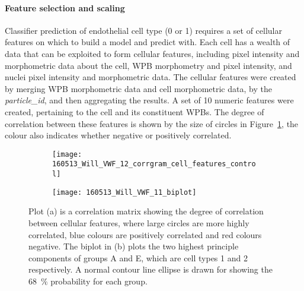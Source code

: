 \paragraph{Feature selection and scaling}
Classifier prediction of endothelial cell type (0 or 1) requires a set of cellular features on which to build a model and predict with. Each cell has a wealth of data that can be exploited to form cellular features, including pixel intensity and morphometric data about the cell, WPB morphometry and pixel intensity, and nuclei pixel intensity and morphometric data. The cellular features were created by merging WPB morphometric data and cell morphometric data, by the \emph{particle\_id}, and then aggregating the results. A set of 10 numeric features were created, pertaining to the cell and its constituent WPBs. The degree of correlation between these features is shown by the size of circles in Figure~\ref{figure:cell_classification:corrgram}, the colour also indicates whether negative or positively correlated.

\begin{figure}[!htbp]
	\centering
	\begin{subfigure}[b]{0.73\linewidth}
		\texttt{[image: 160513\_Will\_VWF\_12\_corrgram\_cell\_features\_control]}
		\caption{}
		\label{figure:cell_classification:corrgram}
	\end{subfigure}
	\begin{subfigure}[b]{0.73\linewidth}
		\texttt{[image: 160513\_Will\_VWF\_11\_biplot]}
		\caption{}
		\label{figure:cell_classification:ggbiplot}
	\end{subfigure}
	\caption[Correlation matrix cellular features plot and biplot of PCA]{Plot (a) is a correlation matrix showing the degree of correlation between cellular features, where large circles are more highly correlated, blue colours are positively correlated and red colours negative. The biplot in (b) plots the two highest principle components of groups A and E, which are cell types 1 and 2 respectively. A normal contour line ellipse is drawn for showing the 68~$\%$ probability for each group.}
	\label{figure:cell_classification:feature_selection_and_PCA}
\end{figure}

